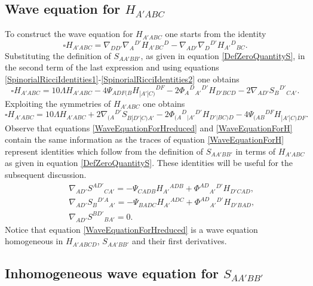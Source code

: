 \documentclass[10pt,a4paper]{article}
\theoremstyle{plain}
\begin{document}
\subsection{Wave equation for $H_{A'ABC}$}
To construct the wave equation for $H_{A'ABC}$ one starts from the
identity
\[
\square H_{A'ABC}= \nabla_{DD'}\nabla_{A}{}^{D'}H_{A'BC}{}^{D} -
\nabla_{AD'}\nabla_{D}{}^{D'}H_{A'}{}^{D}{}_{BC}.
\]
Substituting the definition of $S_{AA'BB'}$, as given in equation
\eqref{DefZeroQuantityS}, in the second term of the last expression
and using equations
\eqref{SpinorialRicciIdentities1}-\eqref{SpinorialRicciIdentities2}
one obtains
\begin{equation}\label{WaveEquationForH}
\square H_{A'ABC} = 10 \Lambda H_{A'ABC} - 4 \Psi_{ADF(B}
H_{|A'|C)}{}^{DF} - 2 \Phi_{A}{}^{D}{}_{A'}{}^{D'} H_{D'BCD} - 2
\nabla_{AD'}S_{B}{}^{D'}{}_{CA'}.
\end{equation}
Exploiting the symmetries of $H_{A'ABC}$ one obtains
\begin{equation}\label{WaveEquationForHreduced}
\square H_{A'ABC} = 10 \Lambda H_{A'ABC} + 2
\nabla_{(A}{}^{D'}S_{B|D'|C)A'} - 2
\Phi_{(A}{}^{D}{}_{|A'}{}^{D'}H_{D'|BC)D} - 4
\Psi_{(AB}{}^{DF}H_{|A'|C)DF}.
\end{equation}
Observe that equations \eqref{WaveEquationForHreduced} and
\eqref{WaveEquationForH} contain the same information as the traces of
equation \eqref{WaveEquationForH} represent identities which follow
from the definition of $S_{AA'BB'}$ in terms of $H_{A'ABC}$ as given
in equation \eqref{DefZeroQuantityS}. These identities will be useful
for the subsequent discussion.
\begin{subequations}
\begin{eqnarray}
&& \nabla_{AD'}S^{AD'}{}_{CA'} = - \Psi_{CADB} H_{A'}{}^{ADB} +
  \Phi^{AD}{}_{A'}{}^{D'} H_{D'CAD}, \label{ExtraEquations1}\\ &&
  \nabla_{AD'}S_{B}{}^{D'A}{}_{A'} = - \Psi_{BADC} H_{A'}{}^{ADC} +
  \Phi^{AD}{}_{A'}{}^{D'} H_{D'BAD}, \label{ExtraEquations2}\\ &&
  \nabla_{AD'}S^{BD'}{}_{BA'} = 0. \label{ExtraEquations3}
\end{eqnarray}
\end{subequations}
Notice that equation \eqref{WaveEquationForHreduced} is a wave
equation homogeneous in $H_{A'ABCD}$, $S_{AA'BB'}$ and their first
derivatives.
 
\subsection{Inhomogeneous wave equation for $S_{AA'BB'}$}
\label{FirstWaveEquationForS}
\end{document}
